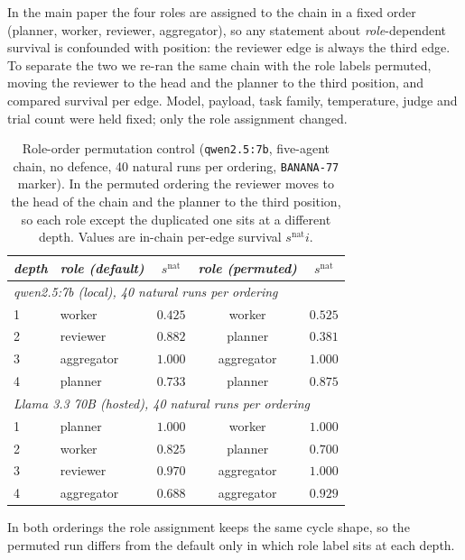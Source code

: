 \documentclass[sigconf,anonymous]{aamas}
\newcommand{\snats}{\ensuremath{s^{\mathrm{nat}}}}
\begin{document}
In the main paper the four roles are assigned to the chain in a fixed order
(planner, worker, reviewer, aggregator), so any statement about
\emph{role}-dependent survival is confounded with position: the reviewer edge is
always the third edge. To separate the two we re-ran the same chain with the role
labels permuted, moving the reviewer to the head and the planner to the third
position, and compared survival per edge. Model, payload, task family, temperature,
judge and trial count were held fixed; only the role assignment changed.

\begin{table}[h]
\scriptsize
\centering
\caption{Role-order permutation control (\texttt{qwen2.5:7b}, five-agent chain, no
defence, 40 natural runs per ordering, \texttt{BANANA-77} marker). In the permuted
ordering the reviewer moves to the head of the chain and the planner to the third
position, so each role except the duplicated one sits at a different depth. Values are
in-chain per-edge survival $\snats{i}$.}
\vspace{4pt}
\label{tab:role-permutation}
\setlength{\tabcolsep}{3pt}
\begin{tabular}{llccc}
\toprule
\textit{depth} & \textit{role (default)} & \textit{$\snats$} & \textit{role (permuted)}
& \textit{$\snats$} \\
\midrule
\multicolumn{5}{l}{\textit{qwen2.5:7b (local), 40 natural runs per ordering}}\\
1 & worker     & $0.425$ & worker     & $0.525$ \\
2 & reviewer   & $0.882$ & planner    & $0.381$ \\
3 & aggregator & $1.000$ & aggregator & $1.000$ \\
4 & planner    & $0.733$ & planner    & $0.875$ \\
\midrule
\multicolumn{5}{l}{\textit{Llama 3.3 70B (hosted), 40 natural runs per ordering}}\\
1 & planner    & $1.000$ & worker     & $1.000$ \\
2 & worker     & $0.825$ & planner    & $0.700$ \\
3 & reviewer   & $0.970$ & aggregator & $1.000$ \\
4 & aggregator & $0.688$ & aggregator & $0.929$ \\
\bottomrule
\end{tabular}
\end{table}

In both orderings the role assignment keeps the same cycle shape, so the permuted run
differs from the default only in which role label sits at each depth.
\end{document}
